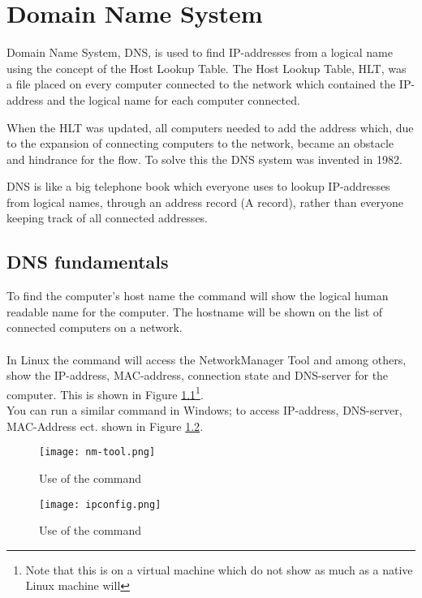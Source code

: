 \documentclass[Preamble]{subfiles}
\begin{document}
\chapter{Domain Name System}


Domain Name System, DNS, is used to find IP-addresses from a logical name using the concept of the Host Lookup Table.
The Host Lookup Table, HLT, was a file placed on every computer connected to the network which contained the IP-address and the logical name for each computer connected\cite[History section]{wiki-hosts}.

When the HLT was updated, all computers needed to add the address which, due to the expansion of connecting computers to the network, became an obstacle and hindrance for the flow.
To solve this the DNS system was invented in 1982\cite[History section]{wiki-dns}.

DNS is like a big telephone book which everyone uses to lookup IP-addresses from logical names, through an address record (A record)\cite[p. 210]{Tanenbaum}, rather than everyone keeping track of all connected addresses.



\section{DNS fundamentals}
To find the computer's host name the command  will show the logical human readable name for the computer. 
The hostname will be shown on the list of connected computers on a  network.
\\
\\
In Linux the command  will access the NetworkManager Tool and among others, show the IP-address, MAC-address, connection state and DNS-server for the computer.
This is shown in Figure \ref{fig:nm-tool}\footnote{Note that this is on a virtual machine which do not show as much as a native Linux machine will}.
\\
You can run a similar command in Windows;  to access IP-address, DNS-server, MAC-Address ect. shown in Figure \ref{fig:ipconfig}.


\begin{figure}[H]
\centering
\texttt{[image: nm-tool.png]}
\caption{Use of the command }
\label{fig:nm-tool}
\end{figure}

\begin{figure}[H]
\centering
\texttt{[image: ipconfig.png]}
\caption{Use of the command }
\label{fig:ipconfig}
\end{figure}
\end{document}
